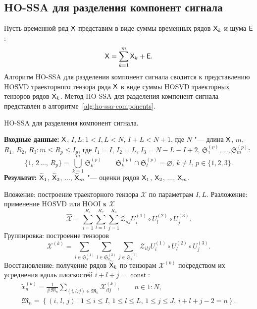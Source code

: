 \documentclass[specialist,
  substylefile=spbu_report.rtx,
subf,href,colorlinks=true, 12pt]{disser}
\theoremstyle{plain}
\theoremstyle{definition}
\theoremstyle{remark}
\newcommand{\Input}{\textbf{Входные данные: }}
\newcommand{\Output}{\textbf{Результат: }}
\begin{document}
\subsection{HO-SSA для разделения компонент сигнала}\label{ho-ssa-sep}
Пусть временной ряд $\mathsf{X}$ представим в виде суммы временных рядов
$\mathsf{X}_k$ и шума $\mathsf{E}$:
\[
  \mathsf{X} = \sum_{k=1}^{m} \mathsf{X}_k + \mathsf{E}.
\]
Алгоритм HO-SSA для разделения компонент сигнала сводится к
представлению \linebreak HOSVD траекторного тензора ряда
$\mathsf{X}$ в виде суммы HOSVD траекторных тензоров рядов $\mathsf{X}_k$.
Метод HO-SSA для разделения компонент сигнала представлен в
алгоритме~\ref{alg:ho-ssa-components}.
\begin{algorithm}[!ht]
  \caption{HO-SSA для разделения компонент сигнала.}
  \label{alg:ho-ssa-components}
  \Input $\mathsf{X}$, $I,L: 1< I,L < N,\, I + L < N + 1$, где $N$ "--- длина $\mathsf{X}$,
  $m$, \linebreak $R_1$, $R_2$, $R_3: m \leqslant R_p\leqslant
  I_p$, где $I_1 = I$, $I_2 = L$, $I_3 = N - L - I + 2$,
  $\mathfrak{S}_1^{(p)}, \ldots, \mathfrak{S}_m^{(p)}$:
  \[
    \{1,\, 2\,\ldots,\, R_p\}=\bigcup_{k=1}^{m}\mathfrak{S}_k^{(p)} \qquad
    \mathfrak{S}_k^{(p)}\cap \mathfrak{S}_l^{(p)} =\varnothing,\,
    k\ne l,\, p \in \{1, 2, 3\}.
  \]
  \Output $\widetilde{\mathsf{X}}_1$, $\widetilde{\mathsf{X}}_2$, $\ldots$,
  $\widetilde{\mathsf{X}}_m$ "--- оценки рядов
  $\mathsf{X}_1$, $\mathsf{X}_2$, $\ldots$, $\mathsf{X}_m$.
  \begin{algorithmic}[1]
    \State \label{algstep:ho-ssa-inj}
    Вложение: построение траекторного тензора $\mathcal{X}$ по
    параметрам $I, L$.
    \State \label{algstep:ho-ssa-decomp}
    Разложение: применение HOSVD или HOOI к $\mathcal{X}$
    \begin{equation}
      \widehat{\mathcal{X}}=\sum_{i=1}^{R_1} \sum_{l=1}^{R_2} \sum_{j=1}^{R_3}
      \mathcal{Z}_{ilj} U^{(1)}_{i}
      \circ U^{(2)}_{l} \circ U^{(3)}_{j}.
      \label{eq:trajectory-hosvd}
    \end{equation}
    \State Группировка: построение тензоров
    \begin{equation*}
      \mathcal{X}^{(k)}=\sum_{i \in \mathfrak{S}_k^{(1)}} \sum_{l\in
      \mathfrak{S}_k^{(2)}}
      \sum_{j\in \mathfrak{S}_k^{(3)}}
      \mathcal{Z}_{ilj} U^{(1)}_{i}\circ U^{(2)}_{l} \circ U^{(3)}_{j}.
    \end{equation*}
    \State Восстановление: получение рядов $\widetilde{\mathsf{X}}_k$ по тензорам
    $\mathcal{X}^{(k)}$ посредством их усреднения вдоль
    плоскостей $i+l+j=\operatorname{const}$:
    \begin{gather*}
      \tilde{x}^{(k)}_n=\frac{1}{\#\mathfrak{M}_n}\sum_{(i,l,j)\in
      \mathfrak{M}_n} \mathcal{X}^{(k)}_{ilj},\qquad n\in
      \overline{1:N},         \\
      \mathfrak{M}_n=\left\{(i,\, l,\, j)~\Big|~1\leqslant i
        \leqslant I,\, 1\leqslant l \leqslant L,\, 1\leqslant j
      \leqslant J,\, i+l+j-2=n\right\}.
    \end{gather*}
  \end{algorithmic}
\end{algorithm}
\end{document}
